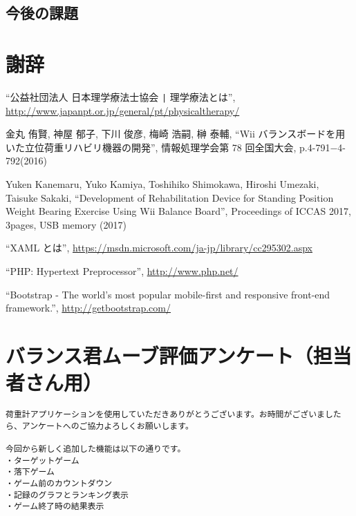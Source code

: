 \documentclass[uplatex,a4paper,12pt]{jsreport}
\begin{document}
\section{今後の課題}\label{sec:kadai}


\chapter*{謝辞}



\begin{thebibliography}{99}%

   ``公益社団法人 日本理学療法士協会 \verb+|+ 理学療法とは'',
  \url{http://www.japanpt.or.jp/general/pt/physicaltherapy/}
    
   金丸 侑賢, 神屋 郁子, 下川 俊彦, 梅崎 浩嗣, 榊 泰輔,
  ``Wii バランスボードを用いた立位荷重リハビリ機器の開発'', 
  情報処理学会第 78 回全国大会, p.4-791$−$4-792(2016)         

   Yuken Kanemaru, Yuko Kamiya, Toshihiko Shimokawa, Hiroshi Umezaki, Taisuke Sakaki, 
  ``Development of Rehabilitation Device for Standing Position Weight Bearing Exercise Using Wii Balance Board'',
  Proceedings of ICCAS 2017, 3pages, USB memory (2017)    

   ``XAML とは'',
  \url{https://msdn.microsoft.com/ja-jp/library/cc295302.aspx}

   ``PHP: Hypertext Preprocessor'',
  \url{ http://www.php.net/ }

   ``Bootstrap - The world's most popular mobile-first and responsive front-end framework.'',      
  \url{ http://getbootstrap.com/ }

\end{thebibliography}
\appendix

\chapter{バランス君ムーブ評価アンケート（担当者さん用）}\label{h:tantou}

\begin{verbatim}
荷重計アプリケーションを使用していただきありがとうございます。お時間がございましたら、アンケートへのご協力よろしくお願いします。

今回から新しく追加した機能は以下の通りです。
・ターゲットゲーム
・落下ゲーム
・ゲーム前のカウントダウン
・記録のグラフとランキング表示
・ゲーム終了時の結果表示
\end{verbatim}
\end{document}
